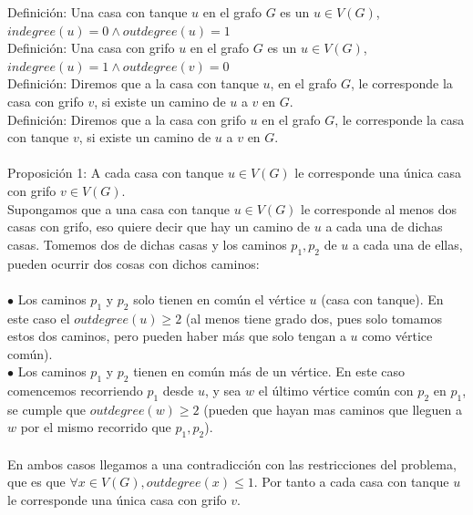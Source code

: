 \documentclass{article}
\begin{document}
    Definici\'on: Una casa con tanque $u$ en el grafo $G$ es un $u \in V(G)$,\\ $indegree(u) = 0 \wedge outdegree(u) = 1$\\

    Definici\'on: Una casa con grifo $u$ en el grafo $G$ es un $u \in V(G)$,\\ $indegree(u) = 1 \wedge outdegree(v) = 0$\\

    Definici\'on: Diremos que a la casa con tanque $u$, en el grafo $G$, le corresponde la casa con grifo
     $v$, si existe un camino de $u$ a $v$ en $G$.\\

    Definici\'on: Diremos que a la casa con grifo $u$ en el 
    grafo $G$, le corresponde la casa con tanque $v$, si existe un camino de $u$ a $v$ en $G$.\\\\

    Proposici\'on 1: A cada casa con tanque $u \in V(G)$ le corresponde una \'unica casa con grifo $v \in V(G)$.\\

    Supongamos que a una casa con tanque $u \in V(G)$ le corresponde al menos dos casas con grifo, eso quiere decir
    que hay un camino de $u$ a cada una de dichas casas. Tomemos dos de dichas casas y los caminos $p_1, p_2$ de $u$
    a cada una de ellas, pueden ocurrir dos cosas con dichos caminos:\\\\

    $\bullet$ Los caminos $p_1$ y $p_2$ solo tienen en com\'un el v\'ertice $u$ (casa con tanque). En este caso
    el $outdegree(u) \geq 2$ (al menos tiene grado dos, pues solo tomamos estos dos caminos, pero pueden haber m\'as que
    solo tengan a $u$ como v\'ertice com\'un).\\

    $\bullet$ Los caminos $p_1$ y $p_2$ tienen en com\'un m\'as de un v\'ertice. En este caso comencemos recorriendo $p_1$ desde
    $u$, y sea $w$ el \'ultimo v\'ertice com\'un con $p_2$ en $p_1$, se cumple que $outdegree(w) \geq 2$ (pueden que hayan mas caminos
    que lleguen a $w$ por el mismo recorrido que $p_1, p_2$).\\\\

    En ambos casos llegamos a una contradicci\'on con las restricciones del problema, que es que $\forall x \in V(G), outdegree(x) \leq 1$. 
    Por tanto a cada casa con tanque $u$ le corresponde una \'unica casa con grifo $v$.\\\\
\end{document}
